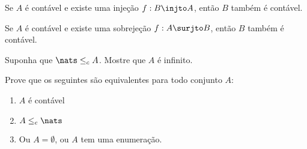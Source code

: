 \begin{exercise}
	Se $A$ é contável e existe uma injeção $f : B \injto A$, então $B$ também é contável.
\end{exercise}

\begin{exercise}
	Se $A$ é contável e existe uma sobrejeção $f : A \surjto B$, então $B$ também é contável.
\end{exercise}

\begin{exercise}
	Suponha que $\nats \leq_c A$. Mostre que $A$ é infinito.
\end{exercise}

\begin{exercise}
	Prove que os seguintes são equivalentes para todo conjunto $A$:
	\begin{enumerate}[(1)]
		\item $A$ é contável
		\item $A \leq_c \nats$
		\item Ou $A = \emptyset$, ou  $A$ tem uma enumeração.
	\end{enumerate}
\end{exercise}
